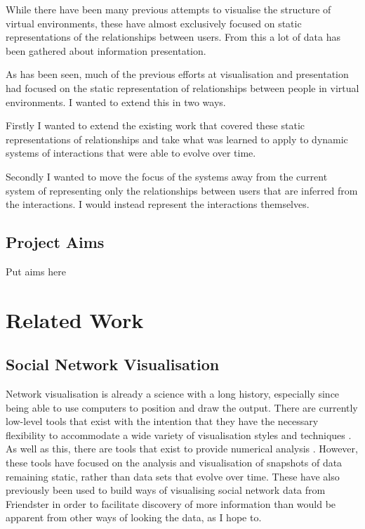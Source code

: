 \documentclass[12pt,a4paper]{article}
\begin{document}
While there have been many previous attempts to visualise the structure of virtual environments, these have almost exclusively focused on static representations of the relationships between users. From this a lot of data has been gathered about information presentation.

As has been seen, much of the previous efforts at visualisation and presentation had focused on the static representation of relationships between people in virtual environments. I wanted to extend this in two ways.

Firstly I wanted to extend the existing work that covered these static representations of relationships and take what was learned to apply to dynamic systems of interactions that were able to evolve over time.

Secondly I wanted to move the focus of the systems away from the current system of representing only the relationships between users that are inferred from the interactions. I would instead represent the interactions themselves.

\subsection{Project Aims}

Put aims here

\section{Related Work}

\subsection{Social Network Visualisation}
Network visualisation is already a science with a long history, especially since being able to use computers to position and draw the output. There are currently low-level tools that exist with the intention that they have the necessary flexibility to accommodate a wide variety of visualisation styles and techniques \cite{heer2005prefuse}. As well as this, there are tools that exist to provide numerical analysis \cite{borgatti2002ucinet}. However, these tools have focused on the analysis and visualisation of snapshots of data remaining static, rather than data sets that evolve over time. These have also previously been used to build ways of visualising social network data from Friendster \cite{heer2005vizster} in order to facilitate discovery of more information than would be apparent from other ways of looking the data, as I hope to.
\end{document}
